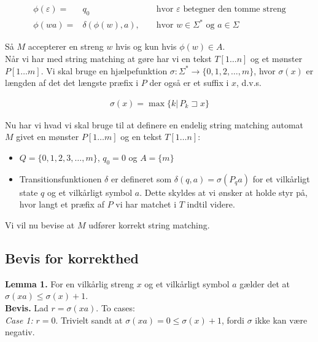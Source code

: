 \documentclass[12pt]{article}
\begin{document}
\begin{align*}
    \phi(\varepsilon) =& q_0 && \text{ hvor } \varepsilon \text{ betegner den tomme streng}\\
    \phi(wa) =& \delta(\phi(w),a), && \text{ hvor } w \in \Sigma^* \text{ og } a \in \Sigma
\end{align*}

Så $M$ accepterer en streng $w$ hvis og kun hvis $\phi(w) \in A$. \\

Når vi har med string matching at gøre har vi en tekst $T[1 \ldots n]$ og et mønster $P[1 \ldots m]$. Vi skal bruge en hjælpefunktion $\sigma: \Sigma^* \rightarrow \{0,1,2,\ldots, m\}$, hvor $\sigma(x)$ er længden af det det længste præfix i $P$ der også er et suffix i $x$, d.v.s. 

\begin{align*}
    \sigma(x) = \max\{k|\, P_k \sqsupset x\}
\end{align*}

Nu har vi hvad vi skal bruge til at definere en endelig string matching automat $M$ givet en mønster $P[1\ldots m]$ og en tekst $T[1 \ldots n]$:

\begin{itemize}
    \item $Q=\{0,1,2,3,\ldots,m\}$, $q_0=0$ og $A=\{m\}$
    \item Transitionsfunktionen $\delta$ er defineret som $\delta(q,a)=\sigma(P_q a)$ for et vilkårligt state $q$ og et vilkårligt symbol $a$. Dette skyldes at vi ønsker at holde styr på, hvor langt et præfix af $P$ vi har matchet i $T$ indtil videre.
\end{itemize}

Vi vil nu bevise at $M$ udfører korrekt string matching. 

\subsection*{Bevis for korrekthed}

\textbf{Lemma 1.} For en vilkårlig streng $x$ og et vilkårligt symbol $a$ gælder det at $\sigma(xa) \le  \sigma(x)+1$. \\

\textbf{Bevis.} Lad $r = \sigma(xa)$. To cases: \\

\textit{Case 1:} $r=0$. Trivielt sandt at $\sigma(xa)=0 \le \sigma(x)+1$, fordi $\sigma$ ikke kan være negativ. \\
\end{document}
